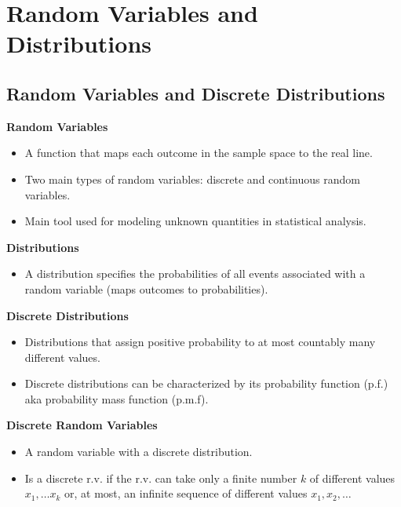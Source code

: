 \documentclass[11pt]{article}
\begin{document}
\section{Random Variables and Distributions}
\subsection{Random Variables and Discrete Distributions}

\textbf{Random Variables}
\begin{itemize}
    \item A function that maps each outcome in the sample space to the real line.
    \item Two main types of random variables: discrete and continuous random variables.
    \item Main tool used for modeling unknown quantities in statistical analysis.
\end{itemize}

\textbf{Distributions}
\begin{itemize}
    \item A distribution specifies the probabilities of all events associated with a random
    variable (maps outcomes to probabilities).
\end{itemize}

\textbf{Discrete Distributions}
\begin{itemize}
    \item Distributions that assign positive probability to at most countably many different
    values.
    \item Discrete distributions can be characterized by its probability function (p.f.) aka
    probability mass function (p.m.f).
\end{itemize}

\textbf{Discrete Random Variables}
\begin{itemize}
    \item A random variable with a discrete distribution.
    \item Is a discrete r.v. if the r.v. can take only a finite number $k$ of different values
    $x_1, \ldots x_k$ or, at most, an infinite sequence of different values $x_1, x_2, \ldots $
\end{itemize}
\end{document}

